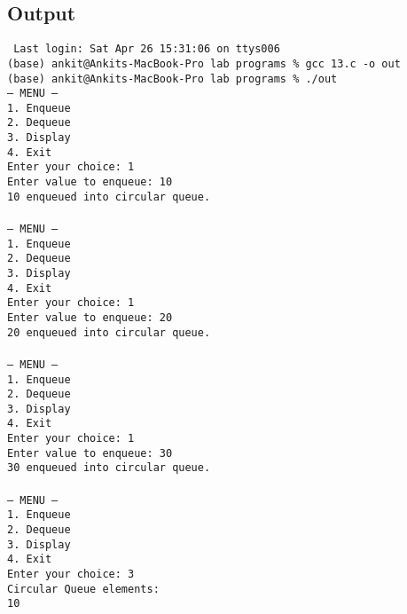 \documentclass[12pt,a4paper]{article}
\begin{document}
\subsection*{Output}
\begin{tcolorbox}[terminalstyle, title=Sample Output]
\texttt{
Last login: Sat Apr 26 15:31:06 on ttys006\\
(base) ankit@Ankits-MacBook-Pro lab programs \% gcc 13.c -o out\\
(base) ankit@Ankits-MacBook-Pro lab programs \% ./out\\
--- MENU ---\\
1. Enqueue\\
2. Dequeue\\
3. Display\\
4. Exit\\
Enter your choice: 1\\
Enter value to enqueue: 10\\
10 enqueued into circular queue.\\
\\
--- MENU ---\\
1. Enqueue\\
2. Dequeue\\
3. Display\\
4. Exit\\
Enter your choice: 1\\
Enter value to enqueue: 20\\
20 enqueued into circular queue.\\
\\
--- MENU ---\\
1. Enqueue\\
2. Dequeue\\
3. Display\\
4. Exit\\
Enter your choice: 1\\
Enter value to enqueue: 30\\
30 enqueued into circular queue.\\
\\
--- MENU ---\\
1. Enqueue\\
2. Dequeue\\
3. Display\\
4. Exit\\
Enter your choice: 3\\
Circular Queue elements:\\
10  \\
\\
}
\end{tcolorbox}
\end{document}
